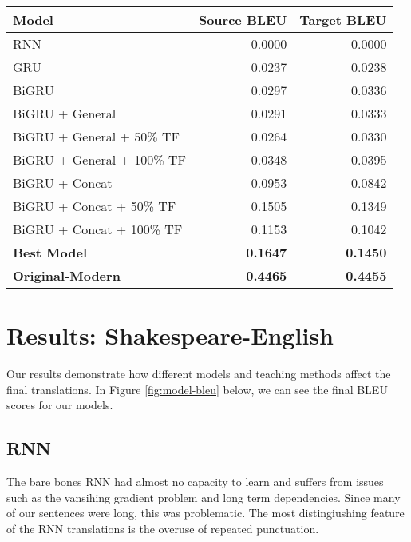 \documentclass[twoside,twocolumn]{article}
\begin{document}
\begin{figure*}
    \centering
    \begin{tabular}{ |l|r|r| }
        \hline
        \textbf{Model}
          & \textbf{Source BLEU} & \textbf{Target BLEU} \\
        \hline
        RNN                             & 0.0000 & 0.0000 \\ \hline
        GRU                             & 0.0237 & 0.0238 \\ \hline
        BiGRU                           & 0.0297 & 0.0336 \\ \hline
        BiGRU + General                 & 0.0291 & 0.0333 \\ \hline
        BiGRU + General + 50\% TF       & 0.0264 & 0.0330 \\ \hline
        BiGRU + General + 100\% TF      & 0.0348 & 0.0395 \\ \hline
        BiGRU + Concat                  & 0.0953 & 0.0842 \\ \hline
        BiGRU + Concat + 50\% TF        & 0.1505 & 0.1349 \\ \hline
        BiGRU + Concat + 100\% TF       & 0.1153 & 0.1042 \\ \hline
        \textbf{Best Model}             & \textbf{0.1647} & \textbf{0.1450} \\ \hline
        \textbf{Original-Modern}  & \textbf{0.4465} & \textbf{0.4455} \\ \hline
    \end{tabular}

    \caption{Model BLEU Results for Experiments. Source BLEU compares results
    to the source (original) sentences. Target BLEU compares results to
    the target (modern) sentences. We aim for high Target BLEUs.}
    \label{fig:model-bleu}
\end{figure*}
\section{Results: Shakespeare-English}
Our results demonstrate how different models and teaching methods affect the
final translations. In Figure \ref{fig:model-bleu} below, we can see the
final BLEU scores for our models.

\subsection{RNN}
The bare bones RNN had almost no capacity to learn and suffers from issues
such as the vansihing gradient problem and long term dependencies. Since many
of our sentences were long, this was problematic. The most distingiushing
feature of the RNN translations is the overuse of repeated punctuation.
\end{document}
